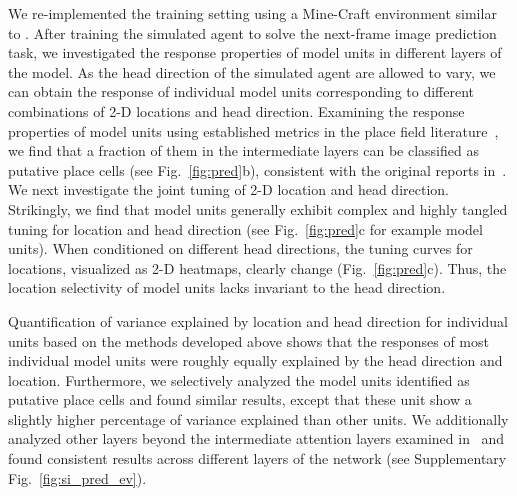 \documentclass[11pt]{article}
\begin{document}
We re-implemented the training setting using a Mine-Craft environment similar to \cite{Gornet2024automated}. After training the simulated agent to solve the next-frame image prediction task, we investigated the response properties of model units in different layers of the model.
As the head direction of the simulated agent are allowed to vary, we can obtain the response of individual model units corresponding to different combinations of 2-D locations and head direction.
Examining the response properties of model units using established metrics in the place field literature~\cite{Tanni2022}, we find that a fraction of them in the intermediate layers can be classified as putative place cells (see Fig.~\ref{fig:pred}b), consistent with the original reports in~\cite{Gornet2024automated}. We next investigate the joint tuning of 2-D location and head direction. Strikingly, we find that model units generally exhibit complex and highly tangled tuning for location and head direction (see Fig.~\ref{fig:pred}c for example model units). When conditioned on different head directions, the tuning curves for locations, visualized as 2-D heatmaps, clearly change (Fig.~\ref{fig:pred}c). Thus, the location selectivity of model units lacks invariant to the head direction. 


Quantification of variance explained by location and head direction for individual units based on the methods developed above shows that the responses of most individual model units were roughly equally explained by the head direction and location. Furthermore, we selectively analyzed the model units identified as putative place cells and found similar results, except that these unit show a slightly higher percentage of variance explained than other units.
We additionally analyzed other layers beyond the intermediate attention layers examined in~\cite{Gornet2024automated} and found consistent results across different layers of the network (see Supplementary Fig.~\ref{fig:si_pred_ev}).

\end{document}
